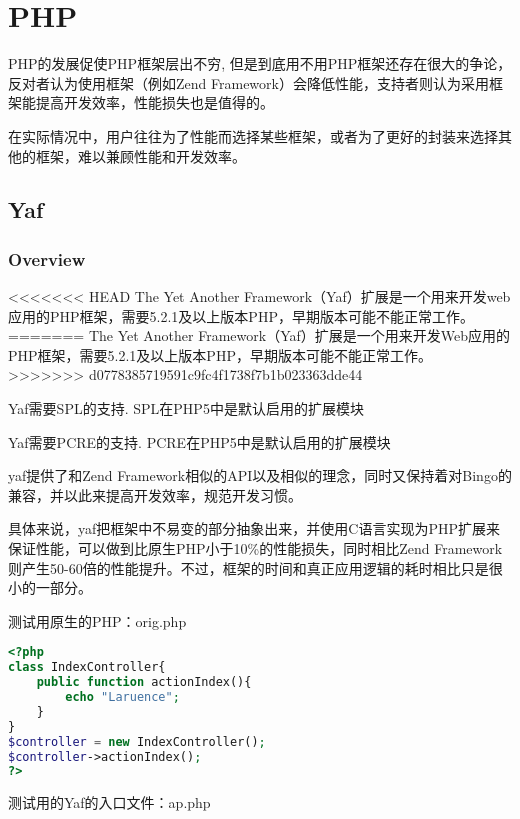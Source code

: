 \chapter{PHP}


PHP的发展促使PHP框架层出不穷, 但是到底用不用PHP框架还存在很大的争论，反对者认为使用框架（例如Zend Framework）会降低性能，支持者则认为采用框架能提高开发效率，性能损失也是值得的。

在实际情况中，用户往往为了性能而选择某些框架，或者为了更好的封装来选择其他的框架，难以兼顾性能和开发效率。



\section{Yaf}


\subsection{Overview}


<<<<<<< HEAD
The Yet Another Framework（Yaf）扩展是一个用来开发web应用的PHP框架，需要5.2.1及以上版本PHP，早期版本可能不能正常工作。
=======
The Yet Another Framework（Yaf）扩展是一个用来开发Web应用的PHP框架，需要5.2.1及以上版本PHP，早期版本可能不能正常工作。
>>>>>>> d0778385719591c9fc4f1738f7b1b023363dde44

\begin{compactitem}
\item Yaf需要SPL的支持. SPL在PHP5中是默认启用的扩展模块
\item Yaf需要PCRE的支持. PCRE在PHP5中是默认启用的扩展模块
\end{compactitem}

yaf提供了和Zend Framework相似的API以及相似的理念，同时又保持着对Bingo的兼容，并以此来提高开发效率，规范开发习惯。

具体来说，yaf把框架中不易变的部分抽象出来，并使用C语言实现为PHP扩展来保证性能，可以做到比原生PHP小于10\%的性能损失，同时相比Zend Framework则产生50-60倍的性能提升。不过，框架的时间和真正应用逻辑的耗时相比只是很小的一部分。


测试用原生的PHP：orig.php

\begin{lstlisting}[language=PHP]
<?php
class IndexController{
	public function actionIndex(){
		echo "Laruence";
	}
}
$controller = new IndexController();
$controller->actionIndex();
?>
\end{lstlisting}

测试用的Yaf的入口文件：ap.php

